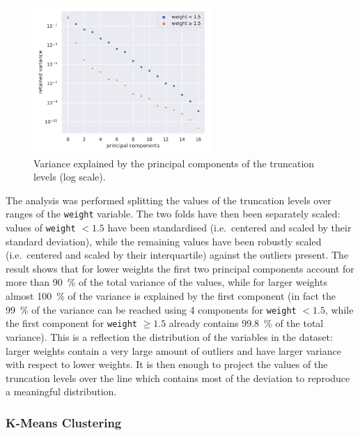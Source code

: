 \begin{figure}[htbp]
  \centering
  \includegraphics[width=0.6\textwidth]{img/svd}
  \caption{Variance explained by the principal components of the truncation levels (log scale).}
  \label{fig:lumps:svd}
\end{figure}

The analysis was performed splitting the values of the truncation levels over ranges of the \texttt{weight} variable.
The two folds have then been separately scaled: values of \texttt{weight} $< 1.5$ have been standardised (i.e.\ centered and scaled by their standard deviation), while the remaining values have been robustly scaled (i.e.\ centered and scaled by their interquartile) against the outliers present.
The result shows that for lower weights the first two principal components account for more than \SI{90}{\percent} of the total variance of the values, while for larger weights almost \SI{100}{\percent} of the variance is explained by the first component (in fact the \SI{99}{\percent} of the variance can be reached using 4 components for \texttt{weight} $< 1.5$, while the first component for \texttt{weight} $\ge 1.5$ already contains \SI{99.8}{\percent} of the total variance).
This is a reflection the distribution of the variables in the dataset: larger weights contain a very large amount of outliers and have larger variance with respect to lower weights.
It is then enough to project the values of the truncation levels over the line which contains most of the deviation to reproduce a meaningful distribution.


\subsubsection{K-Means Clustering}

